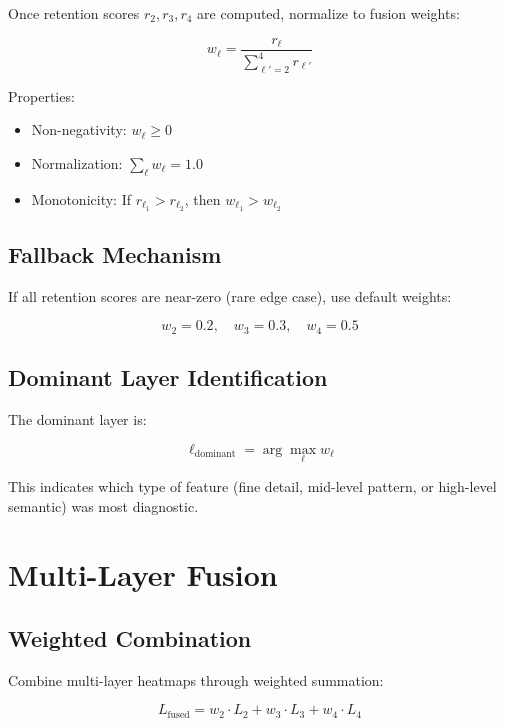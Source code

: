 \documentclass[12pt,a4paper,oneside]{book}
\begin{document}
Once retention scores $r_2, r_3, r_4$ are computed, normalize to fusion weights:

\begin{equation}
w_\ell = \frac{r_\ell}{\sum_{\ell'=2}^{4} r_{\ell'}}
\label{eq:adaptive_weights}
\end{equation}

Properties:
\begin{itemize}
  \item Non-negativity: $w_\ell \geq 0$
  \item Normalization: $\sum_\ell w_\ell = 1.0$
  \item Monotonicity: If $r_{\ell_1} > r_{\ell_2}$, then $w_{\ell_1} > w_{\ell_2}$
\end{itemize}

\subsection{Fallback Mechanism}

If all retention scores are near-zero (rare edge case), use default weights:

\begin{equation}
w_2 = 0.2, \quad w_3 = 0.3, \quad w_4 = 0.5
\end{equation}

\subsection{Dominant Layer Identification}

The dominant layer is:

\begin{equation}
\ell_{\text{dominant}} = \arg\max_\ell w_\ell
\end{equation}

This indicates which type of feature (fine detail, mid-level pattern, or high-level semantic) was most diagnostic.

\section{Multi-Layer Fusion}

\subsection{Weighted Combination}

Combine multi-layer heatmaps through weighted summation:

\begin{equation}
L_{\text{fused}} = w_2 \cdot L_2 + w_3 \cdot L_3 + w_4 \cdot L_4
\label{eq:weighted_fusion}
\end{equation}
\end{document}
